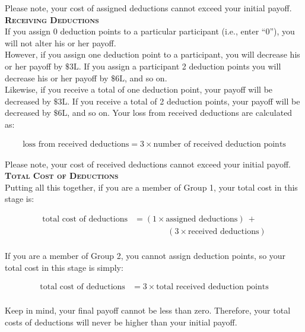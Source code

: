 \documentclass[12pt]{article}
\begin{document}
Please note, your cost of assigned deductions cannot exceed your initial payoff.\\

{\bf \scshape Receiving Deductions}\\

If you assign 0 deduction points to a particular participant (i.e., enter ``0''), you will not alter his or her payoff.\\

However, if you assign one deduction point to a participant, you will decrease his or her payoff by $\$3\text{L}$. If you assign a participant 2 deduction points you will decrease his or her payoff by $\$6\text{L}$, and so on.\\ 

Likewise, if you receive a total of one deduction point, your payoff will be decreased by $\$3\text{L}$. If you receive a total of 2 deduction points, your payoff will be decreased by $\$6\text{L}$, and so on. Your loss from received deductions are calculated as:

\begin{align*}
\text{loss from received deductions} = 3 \times \text{number of received deduction points}
\end{align*} 

Please note, your cost of received deductions cannot exceed your initial payoff.\\

{\bf \scshape Total Cost of Deductions}\\

Putting all this together, if you are a member of Group 1, your total cost in this stage is:

\begin{align*}
\text{total cost of deductions} &= (1 \times \text{assigned deductions}) ~ + \\
& \qquad \qquad (3 \times \text{received deductions})\\
\end{align*}

If you are a member of Group 2, you cannot assign deduction points, so your total cost in this stage is simply:

\begin{align*}
\text{total cost of deductions} &= 3 \times \text{total received deduction points}\\
\end{align*}

Keep in mind, your final payoff cannot be less than zero. Therefore, your total costs of deductions will never be higher than your initial payoff.\\
\end{document}
